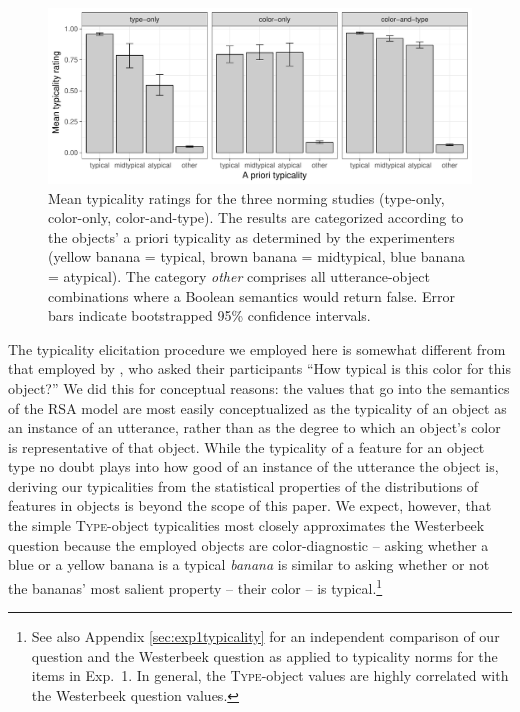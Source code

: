 \documentclass[11pt]{article}
\newcommand{\appref}[1]{Appendix \ref{#1}}
\begin{document}
\begin{figure}
	\centering
	\includegraphics[width=\textwidth]{pics/exp2colortypicalitymeans.pdf}
	\caption{Mean typicality ratings for the three norming studies (type-only, color-only, color-and-type). The results are categorized according to the objects' a priori typicality as determined by the experimenters (yellow banana = typical, brown banana = midtypical, blue banana = atypical). The category \emph{other} comprises all utterance-object combinations where a Boolean semantics would return false. Error bars indicate bootstrapped 95\% confidence intervals.}
	\label{fig:exp2colortypicalitymeans}
\end{figure}

The typicality elicitation procedure we employed here is somewhat different from that employed by , who asked their participants ``How typical is this color for this object?'' We did this for conceptual reasons: the values that go into the semantics of the RSA model are most easily conceptualized as the typicality of an object as an instance of an utterance, rather than as the degree to which an object's color is representative of that object. While the typicality of a feature for an object type no doubt plays into how good of an instance of the utterance the object is, deriving our typicalities from the  statistical properties of the distributions of features in objects is beyond the scope of this paper. We expect, however, that the simple \textsc{Type}-object typicalities most closely approximates the Westerbeek question because the employed objects are color-diagnostic -- asking whether a blue or a yellow banana is a typical \textit{banana} is similar to asking whether or not the bananas' most salient property -- their color -- is typical.\footnote{See also \appref{sec:exp1typicality} for an independent comparison of our question and the Westerbeek question as applied to typicality norms for the items in Exp.~1. In general, the \textsc{Type}-object values are highly correlated with the Westerbeek question values.} 
\end{document}
